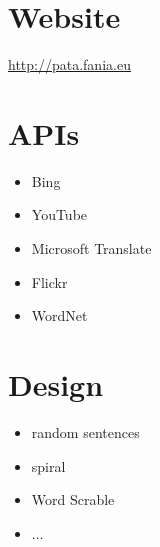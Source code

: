 \section{Website}

\url{http://pata.fania.eu}

\section{APIs}

\begin{itemize}
  \item Bing
  \item YouTube
  \item Microsoft Translate
  \item Flickr
  \item WordNet
\end{itemize}

\section{Design}

\begin{itemize}
  \item random sentences
  \item spiral
  \item Word Scrable
  \item $\dots$
\end{itemize}

